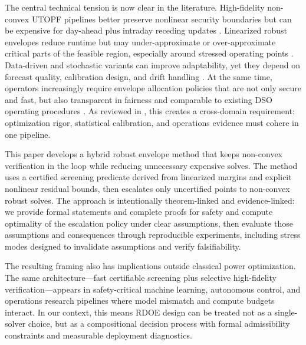 \documentclass{article} %
\begin{document}
The central technical tension is now clear in the literature. High-fidelity non-convex UTOPF pipelines better preserve nonlinear security boundaries but can be expensive for day-ahead plus intraday receding updates \citep{KA01,KA05,KA21}. Linearized robust envelopes reduce runtime but may under-approximate or over-approximate critical parts of the feasible region, especially around stressed operating points \citep{KA02,KA22}. Data-driven and stochastic variants can improve adaptability, yet they depend on forecast quality, calibration design, and drift handling \citep{KA04,KA06,KA07}. At the same time, operators increasingly require envelope allocation policies that are not only secure and fast, but also transparent in fairness and comparable to existing DSO operating procedures \citep{KA08,KA10,KA14}. As reviewed in \citet{KA35}, this creates a cross-domain requirement: optimization rigor, statistical calibration, and operations evidence must cohere in one pipeline.

This paper develops a hybrid robust envelope method that keeps non-convex verification in the loop while reducing unnecessary expensive solves. The method uses a certified screening predicate derived from linearized margins and explicit nonlinear residual bounds, then escalates only uncertified points to non-convex robust solves. The approach is intentionally theorem-linked and evidence-linked: we provide formal statements and complete proofs for safety and compute optimality of the escalation policy under clear assumptions, then evaluate those assumptions and consequences through reproducible experiments, including stress modes designed to invalidate assumptions and verify falsifiability.

The resulting framing also has implications outside classical power optimization. The same architecture---fast certifiable screening plus selective high-fidelity verification---appears in safety-critical machine learning, autonomous control, and operations research pipelines where model mismatch and compute budgets interact. In our context, this means RDOE design can be treated not as a single-solver choice, but as a compositional decision process with formal admissibility constraints and measurable deployment diagnostics.
\end{document}
